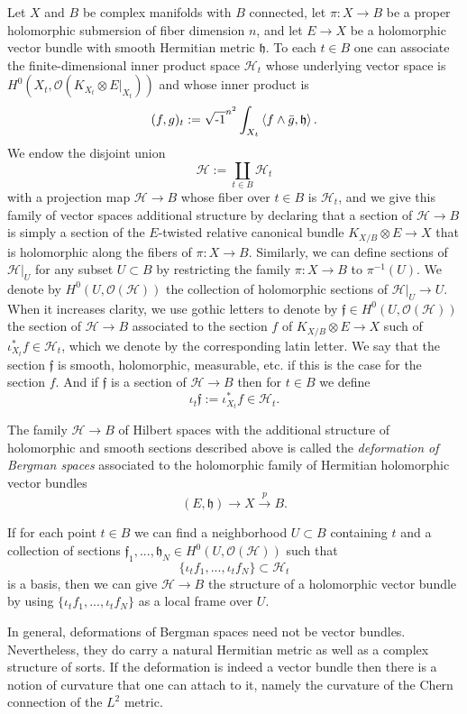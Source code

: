 \documentclass[12pt,hidelinks]{amsart}
\newcommand{\cO}{{\mathcal O}}
\newcommand{\sH}{{\mathscr H}}
\newcommand{\ff}{{\mathfrak f}}
\newcommand{\fh}{{\mathfrak h}}
\newcommand{\ii}{\sqrt{\text{\rm -}1}}
\newcommand{\tensor}{\otimes}
\begin{document}
Let $X$ and $B$ be complex manifolds with $B$ connected, let $\pi :X \to B$ be a proper holomorphic submersion of fiber dimension $n$, and let $E \to X$ be a holomorphic vector bundle with smooth Hermitian metric $\fh$.  To each $t \in B$ one can associate the finite-dimensional inner product space  $\sH _t$ whose underlying vector space is $H^0(X_t, \cO (K_{X_t} \tensor E|_{X_t}))$ and whose inner product is 
\[
(f,g) _t := \ii ^{n^2} \int _{X_t} \left < f \wedge \bar g , \fh \right >.
\]
We endow the disjoint union 
\[
\sH := \coprod _{t \in B} \sH _t
\]
with a projection map $\sH \to B$ whose fiber over $t \in B$ is $\sH _t$, and we give this family of vector spaces additional structure by declaring that a section of $\sH \to B$ is simply a section of the $E$-twisted relative canonical bundle $K_{X/B}\tensor E \to X$ that is holomorphic along the fibers of $\pi : X \to B$.  Similarly, we can define sections of $\sH |_U$ for any subset $U \subset B$ by restricting the family $\pi :X \to B$ to $\pi ^{-1} (U)$.  We denote by $H^0(U, \cO(\sH))$ the collection of holomorphic sections of $\sH |_U \to U$.  When it increases clarity, we use gothic letters to denote by $\ff \in H^0(U,\cO (\sH))$ the section of $\sH \to B$ associated to the section $f$ of $K_{X/B} \tensor E \to X$ such of $\iota _{X_t} ^*f \in \sH _t$, which we denote by the corresponding latin letter.  We say that the section $\ff$ is smooth, holomorphic, measurable, etc. if this is the case for the section $f$.    And if $\ff$ is a section of $\sH \to B$ then for $t \in B$ we define 
\[
\iota _t \ff := \iota _{X_t}^* f \in \sH _t.
\]
\begin{defn}\label{def-of-bergs-defn}
The family $\sH \to B$ of Hilbert spaces with the additional structure of holomorphic and smooth sections described above is called the \emph{deformation of Bergman spaces} associated to the holomorphic family of Hermitian holomorphic vector bundles 
\[
(E,\fh) \to X \stackrel{p}{\to} B.
\]
\end{defn}

If for each point $t \in B$ we can find a neighborhood $U\subset B$ containing $t$ and a collection of sections $\ff _1,..., \fh _N \in H^0 (U, \cO (\sH))$ such that 
\[
\{ \iota _tf_1,..., \iota _tf_N\} \subset \sH _t
\]
is a basis, then we can give $\sH \to B$ the structure of a holomorphic vector bundle by using $\{ \iota _tf_1,..., \iota _tf_N\}$ as a local frame over $U$.

In general, deformations of Bergman spaces need not be vector bundles.  Nevertheless, they do carry a natural Hermitian metric as well as a complex structure of sorts.  If the deformation is indeed a vector bundle then there is a notion of curvature that one can attach to it, namely the curvature of the Chern connection of the $L^2$ metric.  
\end{document}
